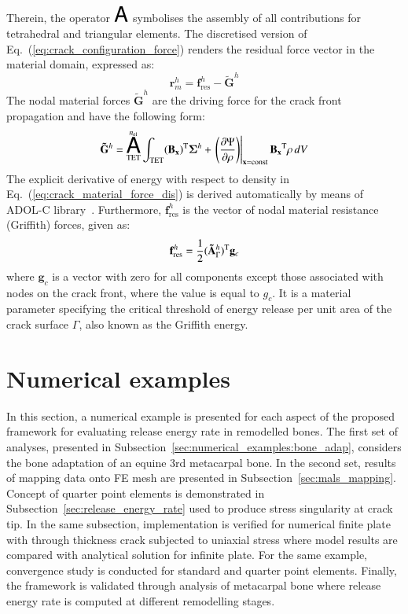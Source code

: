 \documentclass[11pt]{acmeArticle}
\DeclareMathOperator*{\aoperator}{ \text{\huge${\mathsf{A}}$}}
\numberwithin{equation}{section}
\begin{document}
Therein, the operator $ \aoperator$ symbolises the assembly of all contributions for tetrahedral and triangular elements. The discretised version of Eq.~(\ref{eq:crack_configuration_force}) renders the residual force vector in the material domain, expressed as:
\begin{equation}
\mathbf r_m^h = \mathbf f^h_{\text{res}} - \mathbf{\tilde G}^h
\end{equation}
The nodal material forces $\mathbf{\tilde G}^h$ are the driving force for the crack front propagation and have the following form:
\begin{equation}\label{eq:crack_material_force_dis}
\mathbf{\tilde G}^h = \aoperator_{\text{TET}}^{n_{\rm {el}}} \int_\text{TET} (\mathbf{B_x})^{\rm T} {\bm {\Sigma}}^h +   \left.\left( \frac{\partial \Psi}{\partial \rho} \right)\right|_{\mathbf{x}= \text {const}} \mathbf{B_x}^{\rm T} \rho \mathrm \,d V
\end{equation}
The explicit derivative of energy with respect to density in Eq.~(\ref{eq:crack_material_force_dis}) is derived automatically by means of ADOL-C library~\citep{Walther2009}. 
Furthermore, $\mathbf f^h_{\text {res}}$ is the vector of nodal material resistance (Griffith) forces, given as:
\begin{equation}
\mathbf f^h_{\text{res}} = \frac{1}{2} (\mathbf{\tilde A}^h_\Gamma)^{\rm T} \mathbf g_c
\end{equation}
where $ \mathbf g_c$ is a vector with zero for all components except those associated with nodes on the crack front, where the value is equal to $g_c$. 
It is a material parameter specifying the critical threshold of energy release per unit area of the crack surface $\Gamma$, also known as the Griffith energy.

\section{Numerical examples}
\label{sec:numerical_examples}
In this section, a numerical example is presented for each aspect of the proposed framework for evaluating release energy rate in remodelled bones. 
The first set of analyses, presented in Subsection~\ref{sec:numerical_examples:bone_adap}, considers the bone adaptation of an equine 3rd metacarpal bone. 
In the second set, results of mapping data onto FE mesh are presented in Subsection~\ref{sec:mals_mapping}. 
Concept of quarter point elements is demonstrated in Subsection~\ref{sec:release_energy_rate} used to produce stress singularity at crack tip.
In the same subsection, implementation is verified for numerical finite plate with through thickness crack subjected to uniaxial stress where model results are compared with analytical solution for infinite plate. 
For the same example, convergence study is conducted for standard and quarter point elements.
Finally, the framework is validated through analysis of metacarpal bone where release energy rate is computed at different remodelling stages.
\end{document}
